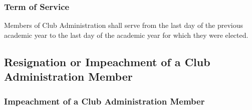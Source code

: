 \documentclass[english,11pt]{article}
\begin{document}
\subsubsection{Term of Service} \label{subsect:cadmin:selection:terms}
Members of Club Administration shall serve from the last day of the previous academic year to the last day of the academic year for which they were elected.

\subsection{Resignation or Impeachment of a Club Administration Member} \label{sect:cadmin:removal}

\subsubsection{Impeachment of a Club Administration Member} \label{subsect:cadmin:removal:impeachment}
\end{document}
